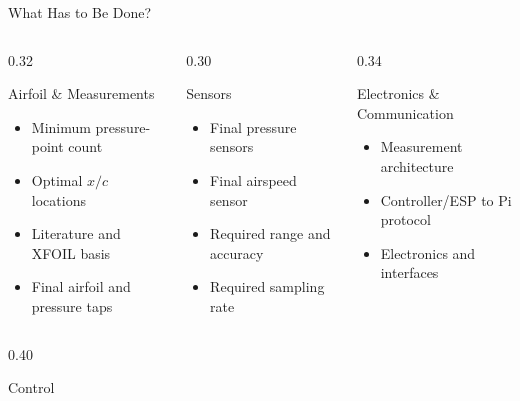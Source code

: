 \documentclass[aspectratio=169,10pt]{beamer}
\newcommand{\xc}{\ensuremath{x/c}}
\newenvironment{points}{\begin{itemize}\setlength{\itemsep}{0.45em}}{\end{itemize}}
\begin{document}
\begin{frame}{What Has to Be Done?}
  \begin{columns}[T,onlytextwidth]
    \begin{column}{0.32\textwidth}
      \begin{block}{Airfoil \& Measurements}
        \begin{itemize}
          \item Minimum pressure-point count
          \item Optimal \xc{} locations
          \item Literature and XFOIL basis
          \item Final airfoil and pressure taps
        \end{itemize}
      \end{block}
    \end{column}
    \begin{column}{0.30\textwidth}
      \begin{block}{Sensors}
        \begin{itemize}
          \item Final pressure sensors
          \item Final airspeed sensor
          \item Required range and accuracy
          \item Required sampling rate
        \end{itemize}
      \end{block}
    \end{column}
    \begin{column}{0.34\textwidth}
      \begin{block}{Electronics \& Communication}
        \begin{itemize}
          \item Measurement architecture
          \item Controller/ESP to Pi protocol
          \item Electronics and interfaces
        \end{itemize}
      \end{block}
    \end{column}
  \end{columns}
  \vspace{0.5em}
  \begin{columns}[T,onlytextwidth]
    \begin{column}{0.40\textwidth}
      \begin{block}{Control}
        \begin{points}

\end{points}
\end{block}
\end{column}
\end{columns}
\end{frame}
\end{document}
